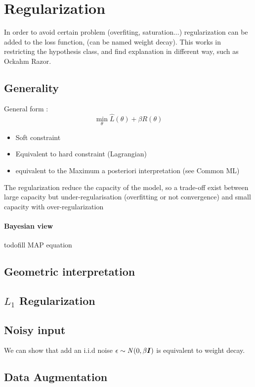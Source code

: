\section{Regularization}

	In order to avoid certain problem (overfiting, saturation...) regularization can be added to the loss function, (can be named weight decay). This works in restricting the hypothesis class, and find explanation in different way, such as Ockahm Razor. 

	\subsection{Generality}
		General form : 
		\[
			\min_\theta \hat L(\theta) + \beta R(\theta)
		\]
		\begin{itemize}
			\item Soft constraint
			\item Equivalent to hard constraint (Lagrangian)
			\item equivalent to the Maximum a posteriori interpretation (see Common ML)
		\end{itemize}

		The regularization reduce the capacity of the model, so a trade-off exist between large capacity but under-regularisation (overfitting or not convergence) and small capacity with over-regularization

		\paragraph*{Bayesian view}
			todo{fill MAP equation}

	\subsection{Geometric interpretation}

	\subsection{$L_1$ Regularization}

	\subsection{Noisy input}
		We can show that add an i.i.d noise $\epsilon \sim \mathit{N}(0, \beta {\boldsymbol{{I}}})$ is equivalent to weight decay.
	\subsection{Data Augmentation}

